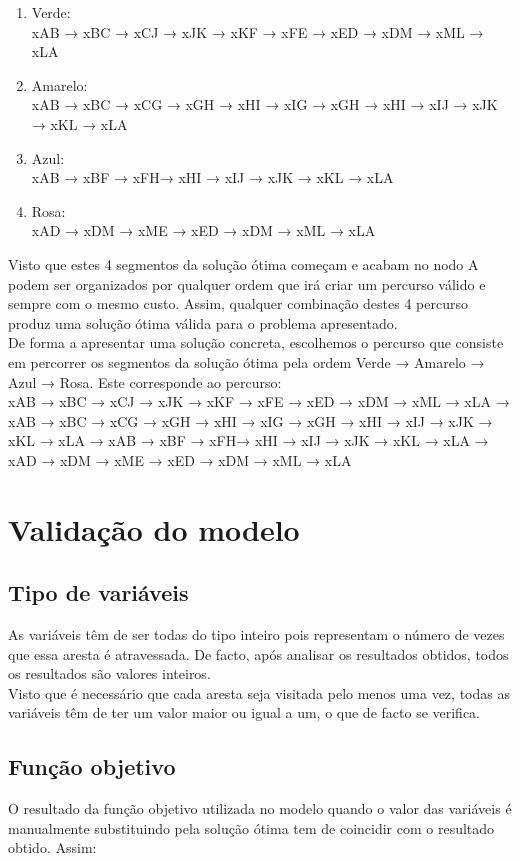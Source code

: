 \documentclass[a4paper]{report}
\begin{document}
\begin{enumerate}
    \item Verde: \\
    xAB → xBC → xCJ → xJK → xKF → xFE → xED → xDM → xML → xLA
    \item Amarelo: \\
    xAB → xBC → xCG → xGH → xHI  → xIG → xGH → xHI → xIJ → xJK  → xKL  → xLA
    \item Azul: \\
    xAB → xBF → xFH→ xHI  → xIJ → xJK  → xKL  → xLA
    \item Rosa: \\
    xAD → xDM → xME → xED  → xDM → xML → xLA
\end{enumerate}
Visto que estes 4 segmentos da solução ótima começam e acabam no nodo A podem
ser organizados por qualquer ordem que irá criar um percurso válido e sempre com
o mesmo custo. Assim, qualquer combinação destes 4 percurso produz uma solução
ótima válida para o problema apresentado.\\
De forma a apresentar uma solução concreta, escolhemos o percurso que consiste em
percorrer os segmentos da solução ótima pela ordem Verde → Amarelo → Azul →
Rosa. Este corresponde ao percurso:\\
xAB → xBC → xCJ → xJK → xKF → xFE → xED → xDM → xML → xLA →
xAB → xBC → xCG → xGH → xHI  → xIG → xGH → xHI → xIJ → xJK  → xKL  → xLA →
xAB → xBF → xFH→ xHI  → xIJ → xJK  → xKL  → xLA →
xAD → xDM → xME → xED  → xDM → xML → xLA

\chapter{Validação do modelo}
\section{Tipo de variáveis}
As variáveis têm de ser todas do tipo inteiro pois representam o número
de vezes que essa aresta é atravessada.
De facto, após analisar os resultados obtidos, todos os resultados são
valores inteiros.\\
Visto que é necessário que cada aresta seja visitada pelo menos uma
vez, todas as variáveis têm de ter um valor maior ou igual a um, o
que de facto se verifica.

\section{Função objetivo}
O resultado da função objetivo utilizada no modelo quando o valor
das variáveis é manualmente substituindo pela solução ótima tem de 
coincidir com o resultado obtido.
Assim:
\end{document}
